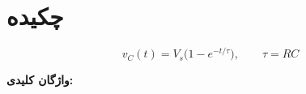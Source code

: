 \section*{چکیده}

\begin{equation*}
v_C(t)=V_s\bigl(1-e^{-t/\tau}\bigr),\qquad \tau=RC
\end{equation*}

\vspace{0.6em}
\noindent\textbf{واژگان کلیدی:}
